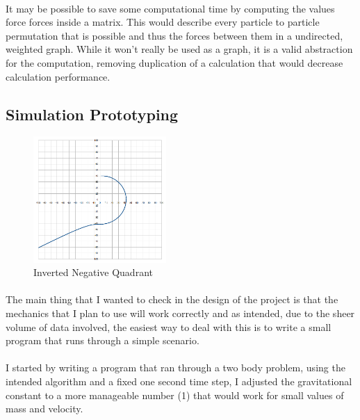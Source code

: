 \paragraph{}
It may be possible to save some computational time by computing the values force forces inside a matrix. This would describe every particle to particle permutation that is possible and thus the forces between them in a undirected, weighted graph. While it won't really be used as a graph, it is a valid abstraction for the computation, removing duplication of a calculation that would decrease calculation performance.

\subsection{Simulation Prototyping}
\begin{figure}
  \centering
  \includegraphics[width=0.45\textwidth]{img/notworking0.png}
  \caption{Inverted Negative Quadrant}
  \vspace{-10pt}
\end{figure}

\paragraph{}
The main thing that I wanted to check in the design of the project is that the mechanics that I plan to use will work correctly and as intended, due to the sheer volume of data involved, the easiest way to deal with this is to write a small program that runs through a simple scenario.

\paragraph{}
I started by writing a program that ran through a two body problem, using the intended algorithm and a fixed one second time step, I adjusted the gravitational constant to a more manageable number (1) that would work for small values of mass and velocity. 

